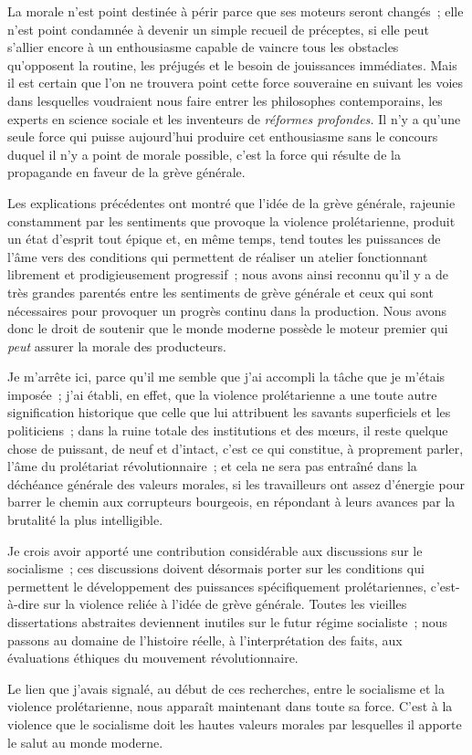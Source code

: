 \documentclass[french,twoside]{book} %
\begin{document}
La morale n’est point destinée à périr parce que ses moteurs seront changés ; elle n’est point condamnée à devenir un simple recueil de préceptes, si elle peut s’allier encore à un enthousiasme capable de vaincre tous les obstacles qu’opposent la routine, les préjugés et le besoin de jouissances immédiates. Mais il est certain que l’on ne trouvera point cette force souveraine en suivant les voies dans lesquelles voudraient nous faire entrer les philosophes contemporains, les experts en science sociale et les inventeurs de \emph{réformes profondes.} Il n’y a qu’une seule force qui puisse aujourd’hui produire cet enthousiasme sans le concours duquel il n’y a point de morale possible, c’est la force qui résulte de la propagande en faveur de la grève générale.\par
Les explications précédentes ont montré que l’idée de la grève générale, rajeunie constamment par les sentiments que provoque la violence prolétarienne, produit un état d’esprit tout épique et, en même temps, tend toutes les puissances de l’âme vers des conditions qui permettent de réaliser un atelier fonctionnant librement et prodigieusement progressif ; nous avons ainsi reconnu qu’il y a de très grandes parentés entre les sentiments de grève générale et ceux qui sont nécessaires pour provoquer un progrès continu dans la production. Nous avons donc le droit de soutenir que le monde moderne possède le moteur premier qui \emph{peut} assurer la morale des producteurs.\par
 Je m’arrête ici, parce qu’il me semble que j’ai accompli la tâche que je m’étais imposée ; j’ai établi, en effet, que la violence prolétarienne a une toute autre signification historique que celle que lui attribuent les savants superficiels et les politiciens ; dans la ruine totale des institutions et des mœurs, il reste quelque chose de puissant, de neuf et d’intact, c’est ce qui constitue, à proprement parler, l’âme du prolétariat révolutionnaire ; et cela ne sera pas entraîné dans la déchéance générale des valeurs morales, si les travailleurs ont assez d’énergie pour barrer le chemin aux corrupteurs bourgeois, en répondant à leurs avances par la brutalité la plus intelligible.\par
Je crois avoir apporté une contribution considérable aux discussions sur le socialisme ; ces discussions doivent désormais porter sur les conditions qui permettent le développement des puissances spécifiquement prolétariennes, c’est-à-dire sur la violence reliée à l’idée de grève générale. Toutes les vieilles dissertations abstraites deviennent inutiles sur le futur régime socialiste ; nous passons au domaine de l’histoire réelle, à l’interprétation des faits, aux évaluations éthiques du mouvement révolutionnaire.\par
Le lien que j’avais signalé, au début de ces recherches, entre le socialisme et la violence prolétarienne, nous apparaît maintenant dans toute sa force. C’est à la violence que le socialisme doit les hautes valeurs morales par lesquelles il apporte le salut au monde moderne.\par
\end{document}
